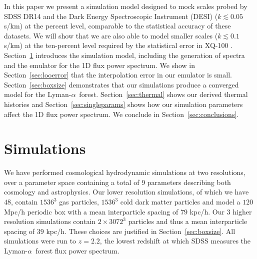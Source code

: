 \documentclass[a4paper,11pt]{article}
\newcommand{\Lya}{Lyman-$\alpha$}
\begin{document}
In this paper we present a simulation model designed to mock scales probed by SDSS DR14 and the Dark Energy Spectroscopic Instrument (DESI) ($k \lesssim 0.05$ s/km) at the percent level, comparable to the statistical accuracy of these datasets. We will show that we are also able to model smaller scales ($k \lesssim 0.1$ s/km) at the ten-percent level required by the statistical error in XQ-100 \cite{KODIAQ:2022}. %
Section~\ref{sec:simulations} introduces the simulation model, including the generation of spectra and the emulator for the 1D flux power spectrum. We show in Section~\ref{sec:looerror} that the interpolation error in our emulator is small. Section~\ref{sec:boxsize} demonstrates that our simulations produce a converged model for the \Lya~forest. Section~\ref{sec:thermal} shows our derived thermal histories and Section~\ref{sec:singleparams} shows how our simulation parameters affect the 1D flux power spectrum. We conclude in Section~\ref{sec:conclusions}.

\section{Simulations}
\label{sec:simulations}

We have performed cosmological hydrodynamic simulations at two resolutions, over a parameter space containing a total of $9$ parameters describing both cosmology and astrophysics. Our lower resolution simulations, of which we have $48$, contain $1536^3$ gas particles, $1536^3$ cold dark matter particles and model a $120$ Mpc/h periodic box with a mean interparticle spacing of $79$ kpc/h. Our $3$ higher resolution simulations contain $2\times 3072^3$ particles and thus a mean interparticle spacing of $39$ kpc/h. These choices are justified in Section~\ref{sec:boxsize}. All simulations were run to $z=2.2$, the lowest redshift at which SDSS measures the \Lya~forest flux power spectrum.
\end{document}
